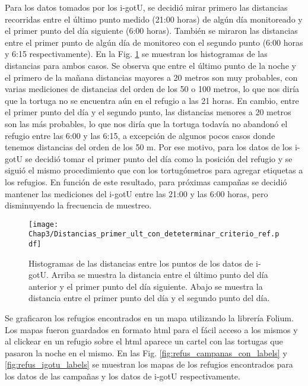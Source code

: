 Para los datos tomados por los i-gotU, se decidió mirar primero las distancias recorridas entre el último punto medido (21:00 horas) de algún día monitoreado y el primer punto del día siguiente (6:00 horas). También se miraron las distancias entre el primer punto de algún día de monitoreo con el segundo punto (6:00 horas y 6:15 respectivamente). En la Fig. \ref{fig:distancias} se muestran los histogramas de las distancias para ambos casos. Se observa que entre el último punto de la noche y el primero de la mañana distancias mayores a 20 metros son muy probables, con varias mediciones de distancias del orden de los 50 o 100 metros, lo que nos diría que la tortuga no se encuentra aún en el refugio a las 21 horas. En cambio, entre el primer punto del día y el segundo punto, las distancias menores a 20 metros son las más probables, lo que nos diría que la tortuga todavía no abandonó el refugio entre las 6:00 y las 6:15, a excepción de algunos pocos casos donde tenemos distancias del orden de los 50 m. Por ese motivo, para los datos de los i-gotU se decidió tomar el primer punto del día como la posición del refugio y se siguió el mismo procedimiento que con los tortugómetros para agregar etiquetas a los refugios. En función de este resultado, para próximas campañas se decidió mantener las mediciones del i-gotU entre las 21:00 y las 6:00 horas, pero disminuyendo la frecuencia de muestreo.
 
 
\begin{figure}[ht]
    \begin{center}
        \texttt{[image: Chap3/Distancias\_primer\_ult\_con\_deteterminar\_criterio\_ref.pdf]}
        \caption[Histogramas de las distancias entre los puntos de los datos de i-gotU.]{ Histogramas de las distancias entre los puntos de los datos de i-gotU. Arriba se muestra la distancia entre el último punto del día anterior y el primer punto del día siguiente. Abajo se muestra la distancia entre el primer punto del día y el segundo punto del día.}
        \label{fig:distancias}
        \end{center}
\end{figure}
 
Se graficaron los refugios encontrados en un mapa utilizando la librería Folium. Los mapas fueron guardados en formato html para el fácil acceso a los mismos y al clickear en un refugio sobre el html aparece un cartel con las tortugas que pasaron la noche en el mismo. En las Fig. \ref{fig:refus_campanas_con_labels} y \ref{fig:refus_igotu_labels} se muestran los mapas de los refugios encontrados para los datos de las campañas y los datos de i-gotU respectivamente.
 
